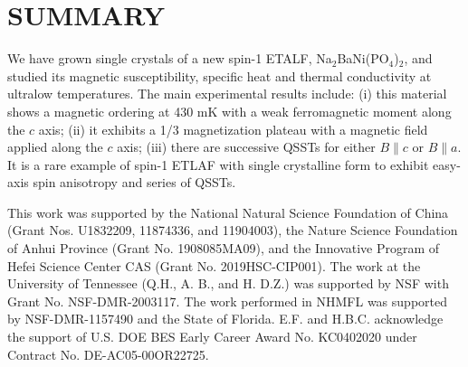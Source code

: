 \documentclass[aps,twocolumn,superscriptaddress,showpacs]{revtex4-1}
\begin{document}
\section{SUMMARY}

We have grown single crystals of a new spin-1 ETALF, Na$_2$BaNi(PO$_4$)$_2$, and studied its magnetic susceptibility, specific heat and thermal conductivity at ultralow temperatures. The main experimental results include: (i) this material shows a magnetic ordering at 430 mK with a weak ferromagnetic moment along the $c$ axis; (ii) it exhibits a 1/3 magnetization plateau with a magnetic field applied along the $c$ axis; (iii) there are successive QSSTs for either $B \parallel c$ or $B \parallel a$. It is a rare example of spin-1 ETLAF with single crystalline form to exhibit easy-axis spin anisotropy and series of QSSTs.

\begin{acknowledgements}

This work was supported by the National Natural Science Foundation of China (Grant Nos. U1832209, 11874336, and 11904003), the Nature Science Foundation of Anhui Province (Grant No. 1908085MA09), and the Innovative Program of Hefei Science Center CAS (Grant No. 2019HSC-CIP001).  The work at the University of Tennessee (Q.H., A. B., and H. D.Z.) was supported by NSF with  Grant No. NSF-DMR-2003117. The work performed in NHMFL was supported by NSF-DMR-1157490 and the State of Florida. E.F. and H.B.C. acknowledge the support of U.S. DOE BES Early Career Award No. KC0402020 under Contract No. DE-AC05-00OR22725.


\end{acknowledgements}
\end{document}
